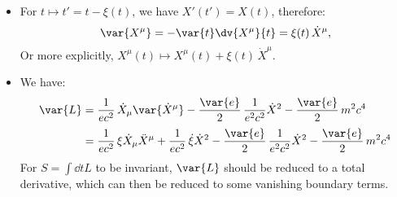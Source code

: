 \documentclass[a4paper,10pt]{article}
\begin{document}
	\begin{itemize}
	\item For $t\mapsto t' = t - \xi(t)$, we have $
		X'(t') = X(t)
	$, therefore:
	\begin{equation}
		\var{X^\mu}
		= -\var{t} \dv{X^\mu}{t}
		= \xi(t)\,\dot{X}^\mu,
	\end{equation}
	Or more explicitly, $
		X^\mu(t)
		\mapsto X^\mu(t) + \xi(t)\,\dot{X}^\mu
	$. 
	
	
	\item We have:
	\begin{equation}
	\begin{aligned}
		\var{L}
		&= \frac{1}{ec^2}\,
				\dot{X}_\mu
				\var{\dot{X}^\mu}
			- \frac{\var{e}}{2}\,
				\frac{1}{e^2 c^2} \dot{X}^2
			- \frac{\var{e}}{2}\,m^2 c^4 \\[.5ex]
		&= \frac{1}{ec^2}\,
				\xi\dot{X}_\mu\ddot{X}^\mu
			+ \frac{1}{ec^2}\,
				\dot{\xi}\dot{X}^2
			- \frac{\var{e}}{2}\,
				\frac{1}{e^2 c^2} \dot{X}^2
			- \frac{\var{e}}{2}\,m^2 c^4
	\end{aligned}
	\end{equation}
	For $
		S = \int\dd{t} {L}
	$ to be invariant, $\var{L}$ should be reduced to a total derivative, which can then be reduced to some vanishing boundary terms. 
	

\end{itemize}
\end{document}
